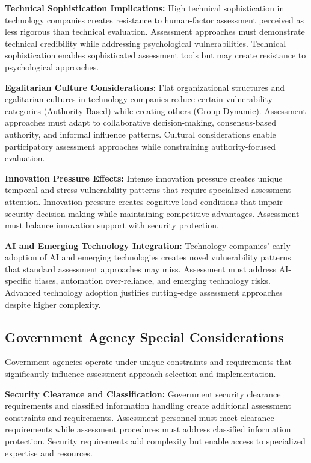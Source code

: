 \documentclass[10pt, twocolumn]{article}
\begin{document}
\textbf{Technical Sophistication Implications:} High technical sophistication in technology companies creates resistance to human-factor assessment perceived as less rigorous than technical evaluation. Assessment approaches must demonstrate technical credibility while addressing psychological vulnerabilities. Technical sophistication enables sophisticated assessment tools but may create resistance to psychological approaches.

\textbf{Egalitarian Culture Considerations:} Flat organizational structures and egalitarian cultures in technology companies reduce certain vulnerability categories (Authority-Based) while creating others (Group Dynamic). Assessment approaches must adapt to collaborative decision-making, consensus-based authority, and informal influence patterns. Cultural considerations enable participatory assessment approaches while constraining authority-focused evaluation.

\textbf{Innovation Pressure Effects:} Intense innovation pressure creates unique temporal and stress vulnerability patterns that require specialized assessment attention. Innovation pressure creates cognitive load conditions that impair security decision-making while maintaining competitive advantages. Assessment must balance innovation support with security protection.

\textbf{AI and Emerging Technology Integration:} Technology companies' early adoption of AI and emerging technologies creates novel vulnerability patterns that standard assessment approaches may miss. Assessment must address AI-specific biases, automation over-reliance, and emerging technology risks. Advanced technology adoption justifies cutting-edge assessment approaches despite higher complexity.

\subsection{Government Agency Special Considerations}

Government agencies operate under unique constraints and requirements that significantly influence assessment approach selection and implementation.

\textbf{Security Clearance and Classification:} Government security clearance requirements and classified information handling create additional assessment constraints and requirements. Assessment personnel must meet clearance requirements while assessment procedures must address classified information protection. Security requirements add complexity but enable access to specialized expertise and resources.
\end{document}
